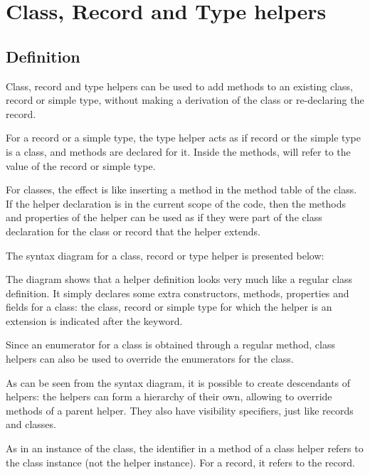 \chapter{Class, Record and Type helpers}
\label{ch:ClassHelpers}
%

\section{Definition}
Class, record and type helpers can be used to add methods to an existing class,
record or simple type, without making a derivation of the class or re-declaring the record.

For a record or a simple type, the type helper acts as if record or the simple type 
is a class, and methods are declared for it. Inside the methods,  will refer 
to the value of the record or simple type.

For classes, the effect is like inserting a method in the method table of the class.
If the helper declaration is in the current scope of the code, then the
methods and properties of the helper can be used as if they were part of the 
class declaration for the class or record that the helper extends.

The syntax diagram for a class, record or type helper is presented below:

The diagram shows that a helper definition looks very much like a regular
class definition. It simply declares some extra constructors, methods, properties and fields
for a class: the class, record or simple type for which the helper is an extension is indicated
after the  keyword. 

Since an enumerator for a class is obtained through a regular method, 
class helpers can also be used to override the enumerators for the class.

As can be seen from the syntax diagram, it is possible to create descendants of helpers: 
the helpers can form a hierarchy of their own, allowing to override methods of a
parent helper. They also have visibility specifiers, just like records and
classes.

As in an instance of the class, the  identifier in a method of a
class helper refers to the class instance (not the helper instance). For a
record, it refers to the record.

